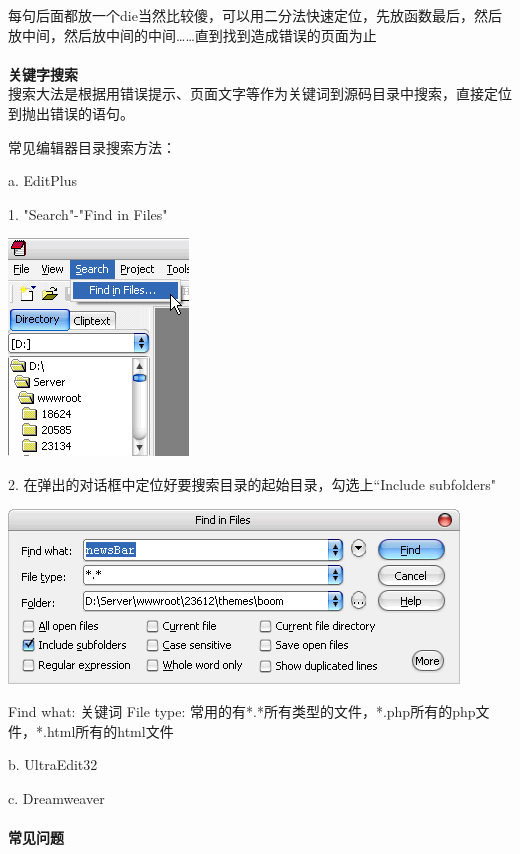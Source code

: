 \documentclass{article}
\begin{document}
每句后面都放一个die当然比较傻，可以用二分法快速定位，先放函数最后，然后放中间，然后放中间的中间……直到找到造成错误的页面为止

\paragraph{}\textbf{关键字搜索}\\

搜索大法是根据用错误提示、页面文字等作为关键词到源码目录中搜索，直接定位到抛出错误的语句。

常见编辑器目录搜索方法：

a. EditPlus

1. "Search"-"Find in Files"

\includegraphics{img/operation/debug/2.png}

2. 在弹出的对话框中定位好要搜索目录的起始目录，勾选上“Include subfolders"

\includegraphics{img/operation/debug/3.png}

Find what:     关键词
File type:       常用的有*.*所有类型的文件，*.php所有的php文件，*.html所有的html文件

b. UltraEdit32

c. Dreamweaver

\paragraph{}\textbf{常见问题}\\
\end{document}
